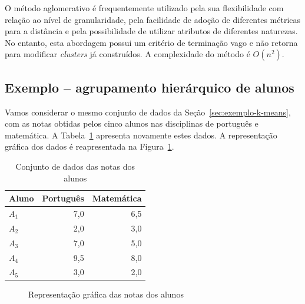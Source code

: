 O método aglomerativo é frequentemente utilizado pela sua flexibilidade com relação ao nível de granularidade, pela facilidade de adoção de diferentes métricas para a distância e pela possibilidade de utilizar atributos de diferentes naturezas. No entanto, esta abordagem possui um critério de terminação vago e não retorna para modificar \textit{clusters} já construídos. A complexidade do método é $O(n^2)$.

\subsection{Exemplo -- agrupamento hierárquico de alunos}

Vamos considerar o mesmo conjunto de dados da Seção~\ref{sec:exemplo-k-means}, com as notas obtidas pelos cinco alunos nas disciplinas de português e matemática. A Tabela~\ref{tab:dados-notas-alunos-2} apresenta novamente estes dados. A representação gráfica dos dados é reapresentada na Figura~\ref{fig:dados-notas-alunos-2}.

\begin{table}[h]
	\centering
	
	\begin{tabular}{lrr}
		\hline
		\textbf{Aluno} & \textbf{Português} & \textbf{Matemática} \\
		\hline
		$A_1$ & 7,0 & 6,5 \\
		$A_2$ & 2,0 & 3,0 \\
		$A_3$ & 7,0 & 5,0 \\
		$A_4$ & 9,5 & 8,0 \\
		$A_5$ & 3,0 & 2,0 \\
		\hline
	\end{tabular}
	
	\caption{Conjunto de dados das notas dos alunos}
	\label{tab:dados-notas-alunos-2}
\end{table}

\begin{figure}[h]
	\centering
	
	
	\caption{Representação gráfica das notas dos alunos}
	\label{fig:dados-notas-alunos-2}
\end{figure}

